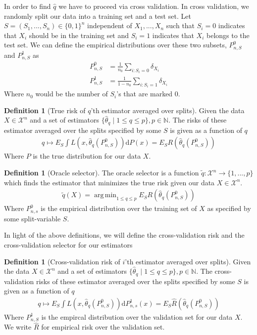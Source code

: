 \documentclass[11pt, a4paper]{article}
\DeclareMathOperator*{\argmin}{arg\,min}
\theoremstyle{definition}
\newtheorem{definition}[theorem]{Definition}
\theoremstyle{remark}
\newcommand{\cl}{q}
\begin{document}
In order to find $ \hat{\cl}  $ we have to proceed via cross validation. In cross validation, we randomly split our data into a training set and a test set. Let $ S = (S_1,...,S_n) \in \{0,1\}^{n} $ independent of $ X_1,..., X_n $ such that $ S_i = 0 $ indicates that $ X_i $ should be in the training set and $ S_i = 1 $ indicates that $ X_i $ belongs to the test set. We can define the empirical distributions over these two subsets, $ P_{n,S}^0$ and $ P_{n,S}^{1} $ as
\begin{align*}
    P_{n,S}^{0} &= \frac{1}{n_0} \sum_{i: S_i = 0} \delta_{X_i} \\
    P_{n,S}^{1} &= \frac{1}{1-n_0} \sum_{i: S_i = 1} \delta_{X_i} 
\end{align*}
Where $ n_0 $ would be the number of $ S_i $'s that are marked $ 0 $. 

\begin{definition}[True risk of $ \cl $'th estimator averaged over splits]
    Given the data $ X \in \mathcal{X}^{n} $ and a set of estimators $ \{ \hat{\theta}_{\cl} \mid 1 \leq \cl \leq p \}, p \in \mathbb{N} $. The risks of these estimator averaged over the splits specified by some $ S $ is given as a function of $ \cl $ 
    \begin{align*}
        \cl \mapsto E_S \int L(x, \hat{\theta}_{\cl}(P_{n,S}^{0}) ) \mathrm{d}P(x) = E_S R( \hat{\theta}_\cl(P_{n,S}^{0})) 
    \end{align*}
    Where $ P $ is the true distribution for our data $ X $.
\end{definition}

\begin{definition}[Oracle selector]
    The oracle selector is a function $ \tilde{\cl}: \mathcal{X}^{n} \to \{1,...,p\} $  which finds the estimator that minimizes the true risk given our data $ X \in \mathcal{X}^{n}$. 
    \begin{align*}
        \tilde{\cl}(X) = \argmin_{1 \leq \cl \leq p} E_S R( \hat{\theta} _\cl (P_{n,S}^0 )) 
    \end{align*}
    Where $ P_{n ,s}^{0} $ is the empirical distribution over the training set of $ X $ as specified by some split-variable $ S $. 
\end{definition}
In light of the above definitions, we will define the cross-validation risk and the cross-validation selector for our estimators

\begin{definition}[Cross-validation risk of $ i $'th estimator averaged over splits]
    Given the data $ X \in \mathcal{X}^{n} $ and a set of estimators $ \{ \hat{\theta}_{\cl} \mid 1 \leq \cl \leq p \}, p \in \mathbb{N} $. The cross-validation risks of these estimator averaged over the splits specified by some $ S $ is given as a function of $ \cl $ 
    \begin{align*}
        \cl \mapsto E_S \int L(x, \hat{\theta}_{\cl}(P_{n,S}^{0}) ) \mathrm{d}P_{n, s}^{1}(x) = E_S \hat{R}( \hat{\theta}_\cl(P_{n,S}^{0})) 
    \end{align*}
    Where $ P_{n,S}^{1} $ is the empircal distribution over the validation set for our data $ X $. We write $ \hat{R} $ for empirical risk over the validation set. 
\end{definition}
\end{document}
